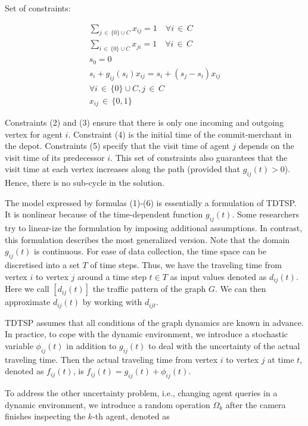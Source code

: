Set of constraints:


\begin{align}
\sum_{j \, \in \, \{ 0 \}\cup C} x_{ij} = 1 \quad  \forall i \, \in \, C \\
\sum_{i \, \in \, \{ 0 \}\cup C} x_{ji} =1 \quad  \forall i \, \in \, C \\
s_{0} = 0 \\
s_{i} + g_{ij}(s_{i})x_{ij} = s_{i} + (s_{j}-s_{i})x_{ij} \\
\forall i \, \in \, \{ 0 \} \cup C, j \, \in \, C \\
x_{ij} \, \in \, \{ 0,1 \} 
\end{align}


Constraints (2) and (3) ensure that there is only one incoming and outgoing vertex for agent $ i $. Constraint (4) is the initial time of the commit-merchant in the depot. Constraints (5) specify that the visit time of agent $ j $ depends on the visit time of its predecessor $ i $. This set of constraints also guarantees that the visit time at each vertex increases along the path (provided that $ g_{ij}(t)>0 $). Hence, there is no sub-cycle in the solution.

The model expressed by formulas (1)-(6) is essentially a formulation of TDTSP. It is nonlinear because of the time-dependent function $ g_{ij} (t)$. Some researchers try to linear-ize the formulation by imposing additional assumptions. In contrast, this formulation describes the most generalized version. Note that the domain $ g_{ij}(t) $ is continuous. For ease of data collection, the time space can be discretised into a set $ T $ of time steps. Thus, we have the traveling time from vertex $ i $ to vertex $ j $ around a time step $ t \in T $ as input values denoted as $ d_{ij}(t) $. Here we call $ [d_{ij}(t)] $ the traffic pattern of the graph $ G $. We can then approximate $ d_{ij}(t) $ by working with $ d_{ijt} $.

TDTSP assumes that all conditions of the graph dynamics are known in advance. In practice, to cope with the dynamic environment, we introduce a stochastic variable $ \phi_{ij}(t) $ in addition to $ g_{ij}(t) $ to deal with the uncertainty of the actual traveling time. Then the actual traveling time from vertex $ i $ to vertex $ j $ at time $ t $, denoted as $ f_{ij}(t) $, is $ f_{ij}(t) = g_{ij}(t) + \phi_{ij}(t) $. 

To address the other uncertainty problem, i.e., changing agent queries in a dynamic environment, we introduce a random operation $ \Omega_{k} $ after the camera finishes inspecting the $ k $-th agent, denoted as

